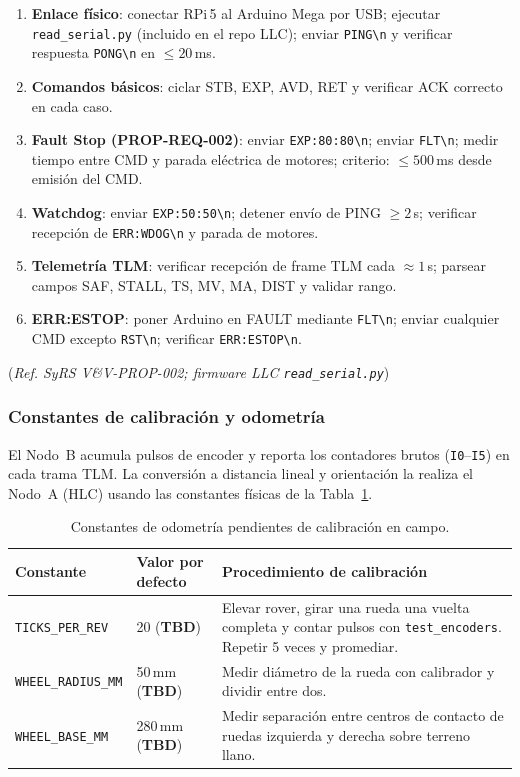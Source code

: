 \begin{enumerate}
  \item \textbf{Enlace físico}: conectar RPi\,5 al Arduino Mega por USB;
        ejecutar \texttt{read\_serial.py} (incluido en el repo LLC);
        enviar \verb|PING\n| y verificar respuesta \verb|PONG\n| en $\leq 20$\,ms.
  \item \textbf{Comandos básicos}: ciclar STB, EXP, AVD, RET y verificar
        ACK correcto en cada caso.
  \item \textbf{Fault Stop (PROP-REQ-002)}: enviar \verb|EXP:80:80\n|;
        enviar \verb|FLT\n|; medir tiempo entre CMD y parada eléctrica
        de motores; criterio: $\leq 500$\,ms desde emisión del CMD.
  \item \textbf{Watchdog}: enviar \verb|EXP:50:50\n|; detener envío de PING
        $\geq 2$\,s; verificar recepción de \verb|ERR:WDOG\n| y parada de motores.
  \item \textbf{Telemetría TLM}: verificar recepción de frame TLM cada $\approx 1$\,s;
        parsear campos SAF, STALL, TS, MV, MA, DIST y validar rango.
  \item \textbf{ERR:ESTOP}: poner Arduino en FAULT mediante \verb|FLT\n|;
        enviar cualquier CMD excepto \verb|RST\n|; verificar \verb|ERR:ESTOP\n|.
\end{enumerate}
(\emph{Ref. SyRS V\&V-PROP-002; firmware LLC \texttt{read\_serial.py}})

\subsubsection{Constantes de calibración y odometría}
\label{sssec:icd_llc_calib}

El Nodo~B acumula pulsos de encoder y reporta los contadores brutos
(\texttt{I0}–\texttt{I5}) en cada trama TLM.
La conversión a distancia lineal y orientación la realiza el Nodo~A (HLC)
usando las constantes físicas de la Tabla~\ref{tab:icd_llc_odo_const}.

\begin{table}[H]
\centering
\small
\renewcommand{\arraystretch}{1.3}
\begin{tabular}{llp{5.5cm}}
\toprule
\textbf{Constante} & \textbf{Valor por defecto} & \textbf{Procedimiento de calibración} \\
\midrule
\texttt{TICKS\_PER\_REV}  & 20 (\textbf{TBD}) &
  Elevar rover, girar una rueda una vuelta completa y contar pulsos con
  \texttt{test\_encoders}. Repetir 5 veces y promediar. \\
\texttt{WHEEL\_RADIUS\_MM} & 50\,mm (\textbf{TBD}) &
  Medir diámetro de la rueda con calibrador y dividir entre dos. \\
\texttt{WHEEL\_BASE\_MM}  & 280\,mm (\textbf{TBD}) &
  Medir separación entre centros de contacto de ruedas izquierda y
  derecha sobre terreno llano. \\
\bottomrule
\end{tabular}
\caption{Constantes de odometría pendientes de calibración en campo.}
\label{tab:icd_llc_odo_const}
\end{table}

